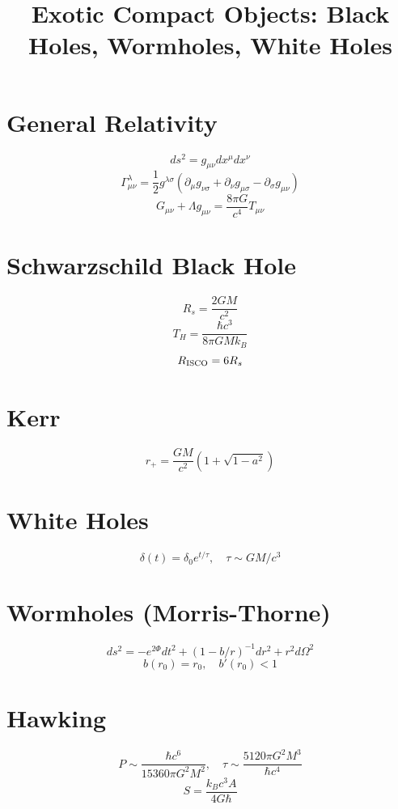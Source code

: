 \documentclass{article}
\title{Exotic Compact Objects: Black Holes, Wormholes, White Holes}
\begin{document}
\maketitle

\section{General Relativity}
$$ds^2 = g_{\mu\nu} dx^\mu dx^\nu$$
$$\Gamma^\lambda_{\mu\nu} = \frac12 g^{\lambda\sigma}(\partial_\mu g_{\nu\sigma}+\partial_\nu g_{\mu\sigma}-\partial_\sigma g_{\mu\nu})$$
$$G_{\mu\nu}+\Lambda g_{\mu\nu}=\frac{8\pi G}{c^4}T_{\mu\nu}$$

\section{Schwarzschild Black Hole}
$$R_s=\frac{2GM}{c^2}$$
$$T_H=\frac{\hbar c^3}{8\pi G M k_B}$$
$$R_{\rm ISCO}=6R_s$$

\section{Kerr}
$$r_+=\frac{GM}{c^2}(1+\sqrt{1-a^2})$$

\section{White Holes}
$$\delta(t)=\delta_0 e^{t/\tau},\quad \tau\sim GM/c^3$$

\section{Wormholes (Morris-Thorne)}
$$ds^2=-e^{2\Phi}dt^2+(1-b/r)^{-1}dr^2+r^2 d\Omega^2$$
$$b(r_0)=r_0,\quad b'(r_0)<1$$

\section{Hawking}
$$P\sim \frac{\hbar c^6}{15360\pi G^2 M^2},\quad \tau\sim \frac{5120\pi G^2 M^3}{\hbar c^4}$$
$$S=\frac{k_B c^3 A}{4G\hbar}$$
\end{document}
